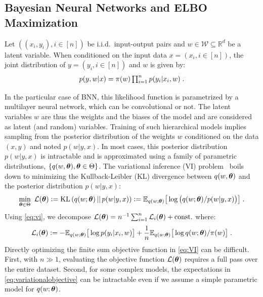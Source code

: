 \documentclass{article} %
\begin{document}
\subsection{Bayesian Neural Networks and ELBO Maximization}
Let $((x_i,y_i),  i \in [n])$ be i.i.d.~input-output pairs and $w \in \mathcal{W} \subseteq \mathbb{R}^{d}$ be a latent variable. When conditioned on the input data $x = (x_i, i \in [n])$, the joint distribution of $y = (y_i, i \in [n])$ and $w$ is given by:
\begin{equation}\label{eq:vi} \textstyle
    p(y,w | x) = \prior(w)\prod_{i=1}^{n}{p(y_i | x_i, w)} \eqsp.
\end{equation}

In the particular case of BNN, this likelihood function is parametrized by a multilayer neural network, which can be convolutional or not.
The latent variables $w$ are thus the weights and the biases of the model and are considered as latent (and random) variables.
Training of such hierarchical models implies sampling from the posterior distribution of the weights $w$ conditioned on the data $(x,y)$ and noted $p(w|y,x)$.
In most cases, this posterior distribution $p(w|y,x)$ is intractable and is approximated using a family of parametric distributions, $\{q(w, \param ), \param \in \Param \}$. 
The variational inference (VI) problem~\citep{blei2017variational} boils down to minimizing the Kullback-Leibler (KL) divergence between $q(w, \param )$ and the posterior distribution $p(w|y,x)$:
\begin{equation} \label{eq:VI}  
\min_{ \param \in \Param }~{\cal L}(\param ) \eqdef \infdiv{q(w; \param )}{p(w|y,x)} \eqdef \EE_{ q( w; \param )} \big[ \log \big( q(w; \param ) / p(w|y,x) \big) \big] \eqsp.
\end{equation}
Using \eqref{eq:vi}, we decompose ${\cal L}(\param) = n^{-1} \sum_{i=1}^{n}{{\cal L}_i(\param)} + {\rm const}.$ where:
\begin{equation}\label{eq:variationalobjective}
{\cal L}_i(\param) \eqdef -\EE_{ q( w; \param )} \big[\log p(y_i | x_i, w) \big]+  \frac{1}{n} \EE_{ q( w; \param )} \big[ \log q(w; \param )/\prior(w) \big]  \eqsp.
\end{equation}
Directly optimizing the finite sum objective function in \eqref{eq:VI} can be difficult.
First, with $n \gg 1$, evaluating the objective function ${\cal L}( \param )$ requires a full pass over the entire dataset.
Second, for some complex models, the expectations in \eqref{eq:variationalobjective} can be intractable even if we assume a simple parametric model for $q(w; \param)$.
\end{document}
